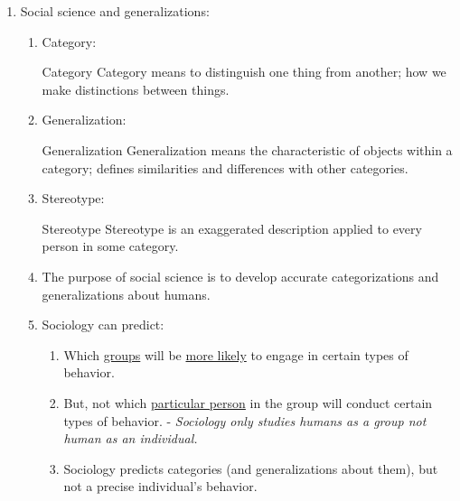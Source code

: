 \documentclass[12pt,a4paper]{article}
\begin{document}
\begin{enumerate}
\begin{enumerate}
\begin{df}{Anecdote}
			Anecdote is a usually short narrative of an interesting, amusing, or biographical incident. 
		\end{df}
		\item Evidence:
		\begin{df}{Evidence}
			Evidence is something that furnishes proof. 
		\end{df}
		\item Empirical: 
		\begin{df}{Empirical}
			The word "empirical" means "based on observation; capable of being verified or disproved by observation or experiment. "
		\end{df}
	\end{enumerate}
	\item Social science and generalizations: 
	\begin{enumerate}
		\item Category: 
		\begin{df}{Category}
			Category means to distinguish one thing from another; how we make distinctions between things. 
		\end{df}
		\item Generalization: 
		\begin{df}{Generalization}
			Generalization means the characteristic of objects within a category; defines similarities and differences with other categories. 
		\end{df}
		\item Stereotype: 
		\begin{df}{Stereotype}
			Stereotype is an exaggerated description applied to every person in some category. 
		\end{df}
		\item The purpose of social science is to develop accurate categorizations and generalizations about humans. 
		\item Sociology can predict: 
		\begin{enumerate}
			\item Which \underline{groups} will be \underline{more likely} to engage in certain types of behavior. 
			\item But, not which \underline{particular person} in the group will conduct certain types of behavior. - \textit{Sociology only studies humans as a group not human as an individual.}
			\item Sociology predicts categories (and generalizations about them), but not a precise individual's behavior.
		\end{enumerate}
	\end{enumerate}
\end{enumerate}
\end{document}
